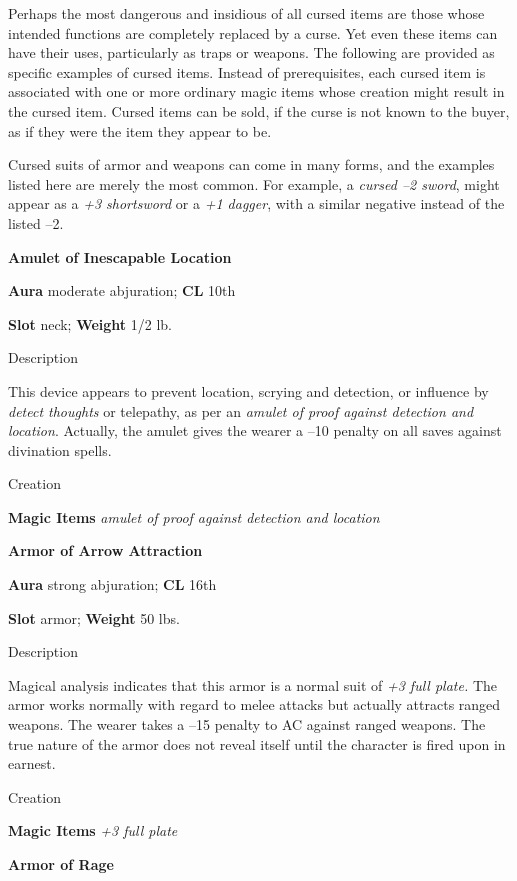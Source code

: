 				
Perhaps the most dangerous and insidious of all cursed items are those whose intended functions are completely replaced by a curse. Yet even these items can have their uses, particularly as traps or weapons. The following are provided as specific examples of cursed items. Instead of prerequisites, each cursed item is associated with one or more ordinary magic items whose creation might result in the cursed item. Cursed items can be sold, if the curse is not known to the buyer, as if they were the item they appear to be.
				
Cursed suits of armor and weapons can come in many forms, and the examples listed here are merely the most common. For example, a \textit{cursed --2 sword}, might appear as a \textit{+3 shortsword }or a \textit{+1 dagger}, with a similar negative instead of the listed --2.
				
\textbf{Amulet of Inescapable Location}
				
\textbf{Aura} moderate abjuration; \textbf{CL} 10th
				
\textbf{Slot} neck; \textbf{Weight }1/2 lb.
				
Description
				
This device appears to prevent location, scrying and detection, or influence by \textit{detect thoughts }or telepathy, as per an \textit{amulet of proof against detection and location}. Actually, the amulet gives the wearer a --10 penalty on all saves against divination spells. 
				
Creation
				
\textbf{Magic Items}\textit{ amulet of proof against detection and location}
				
\textbf{Armor of Arrow Attraction}
				
\textbf{Aura} strong abjuration; \textbf{CL} 16th
				
\textbf{Slot} armor; \textbf{Weight }50 lbs.
				
Description
				
Magical analysis indicates that this armor is a normal suit of \textit{+3 full plate. }The armor works normally with regard to melee attacks but actually attracts ranged weapons. The wearer takes a --15 penalty to AC against ranged weapons. The true nature of the armor does not reveal itself until the character is fired upon in earnest. 
				
Creation
				
\textbf{Magic Items}\textit{ +3 full plate}
				
\textbf{Armor of Rage}
				
